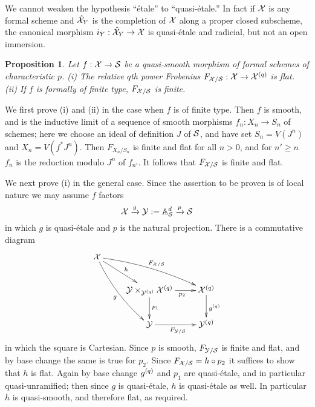 \documentclass{article}
\theoremstyle{change}
\newtheorem{prop}[subsubsection]{Proposition}
\numberwithin{equation}{subsubsection}
\newcommand{\demobox}{\vrule height6pt width6pt depth0pt}
\newenvironment{demo}{\noindent{\it Proof.}}
{{\unskip\nobreak\hfil\qquad
\demobox\parfillskip=0pt\par}
\medskip}
\newenvironment{remark}{\medskip\noindent{\textit{Remark.}}}{\medskip}
\begin{document}
\begin{remark}
  We cannot weaken the hypothesis ``\'etale'' to ``quasi-\'etale.'' In
  fact if ${\cal X}$ is any formal scheme and $\hat{{\cal X}}_Y$ is the completion
  of ${\cal X}$ along a proper closed subscheme, the canonical morphism
  $i_Y:\hat{{\cal X}}_Y\to{\cal X}$ is quasi-\'etale and radicial, but not an open
  immersion.
\end{remark}

\begin{prop}\label{prop:flatness-of-Frobenius}
  Let $f:{\cal X}\to{\cal S}$ be a quasi-smooth morphism of formal schemes of
  characteristic $p$. (i) The relative $q$th power Frobenius
  $F_{{\cal X}/{\cal S}}:{\cal X}\to{{\cal X}}^{({q})}$ is flat. (ii) If $f$ is formally of
  finite type, $F_{{\cal X}/{\cal S}}$ is finite.
\end{prop}
\begin{demo}
  We first prove (i) and (ii) in the case when $f$ is of finite
  type. Then $f$ is smooth, and is the inductive limit of a sequence
  of smooth morphisms $f_n:X_n\to S_n$ of schemes; here we choose an
  ideal of definition $J$ of ${\cal S}$, and have set $S_n=V(J^n)$ and
  $X_n=V(f^*J^n)$. Then $F_{X_n/S_n}$ is finite and flat for all
  $n>0$, and for $n'\ge n$ $f_n$ is the reduction modulo $J^n$ of
  $f_{n'}$. It follows that $F_{{\cal X}/{\cal S}}$ is finite and flat.

  We next prove (i) in the general case. Since the assertion to be
  proven is of local nature we may assume $f$ factors
  \begin{displaymath}
    {\cal X}\xrightarrow{g}{\cal Y}:={\mathbb{A}}^d_{\cal S}\xrightarrow{p}{\cal S}
  \end{displaymath}
  in which $g$ is quasi-\'etale and $p$ is the natural
  projection. There is a commutative diagram
  \begin{displaymath}
    \xymatrix{
      \cX\ar[rd]^h\ar@/^/[rrd]^{F_{\cX/\cS}}\ar@/_/[rdd]_g\\
      &\cY\times_{\niv{\cY}{q}}\niv{\cX}{q}\ar[r]_{\quad p_2}\ar[d]^{p_1}
      &\niv{\cX}{q}\ar[d]^{\niv{g}{q}}\\
      &\cY\ar[r]_{F_{\cY/\cS}}&\niv{\cY}{q}
    }
  \end{displaymath}
  in which the square is Cartesian. Since $p$ is smooth, $F_{{\cal Y}/{\cal S}}$
  is finite and flat, and by base change the same is true for
  $p_2$. Since $F_{{\cal X}/{\cal S}}=h\circ p_2$ it suffices to show that $h$
  is flat. Again by base change ${g}^{({q})}$ and $p_1$ are
  quasi-\'etale, and in particular quasi-unramified; then since $g$ is
  quasi-\'etale, $h$ is quasi-\'etale as well. In particular $h$ is
  quasi-smooth, and therefore flat, as required.


\end{demo}
\end{document}
